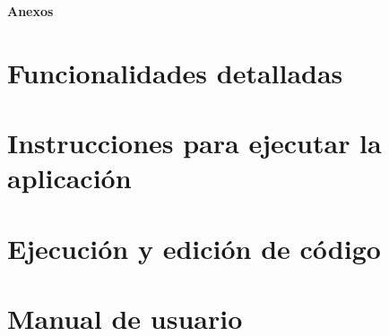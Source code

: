 \documentclass[12pt,twoside,titlepage]{report}
\begin{document}
\footnotesize{
%


}

\normalsize

\raggedbottom
\afterpage{\blankpage}

\newpage





\appendix

{}

\mbox{}
\vfill
\begin{center}
\begin{Huge}
\textbf{Anexos}
\end{Huge}
\end{center}
\vfill
\mbox{}
\thispagestyle{empty}

\newpage
\mbox{}
\thispagestyle{empty}
\newpage


\chapter{Funcionalidades detalladas}
\label{anexo:funcionalidades-detalladas}


\chapter{Instrucciones para ejecutar la aplicación}
\label{anexo:instrucciones-ejecutar-aplicacion}


\chapter{Ejecución y edición de código}
\label{anexo:ejecucion-edicion-codigo}


\chapter{Manual de usuario}
\label{anexo:manual-usuario}


\end{document}
